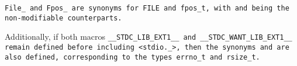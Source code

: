\tt{File_} and \tt{Fpos_} are synonyms for \tt{FILE} and \tt{fpos_t},
with  and  being the non-modifiable counterparts.

Additionally, if both macros \tt{__STDC_LIB_EXT1__} and
\tt{__STDC_WANT_LIB_EXT1__} remain defined before including \tt{<stdio._>},
then the synonyms  and  are also defined,
corresponding to the types \tt{errno_t} and \tt{rsize_t}.
